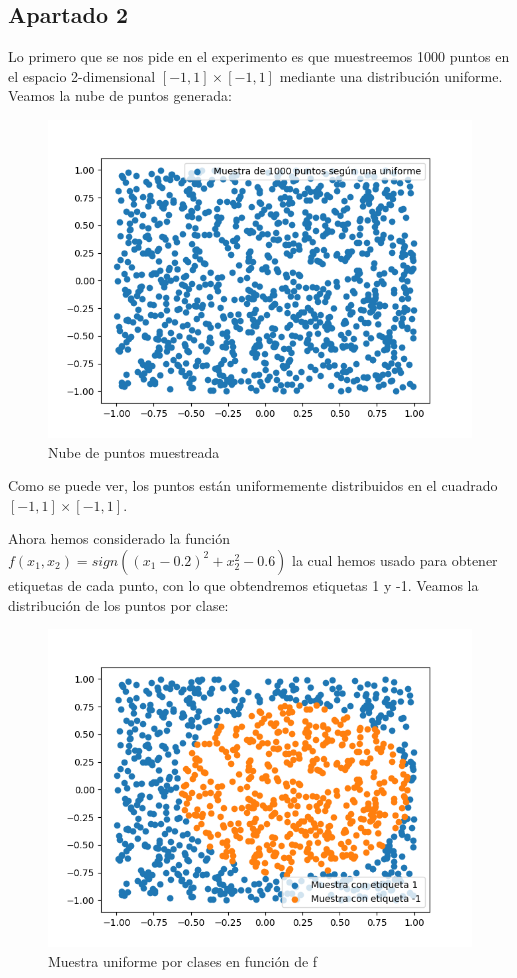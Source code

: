 \documentclass[12pt,a4paper]{article}
\begin{document}
\subsection{Apartado 2}
Lo primero que se nos pide en el experimento es que muestreemos 1000 puntos en el espacio 2-dimensional $[-1,1]\times [-1,1]$ mediante una distribución uniforme. Veamos la nube de puntos generada:

\begin{figure}[H]
	\centering
	\includegraphics[scale=0.7]{./Imagenes/ej2-2-1.png}
	\caption{Nube de puntos muestreada}
	\label{ej2-2-1}
\end{figure}

Como se puede ver, los puntos están uniformemente distribuidos en el cuadrado $[-1,1]\times [-1,1]$.

Ahora hemos considerado la función $f(x_1,x_2) = sign((x_1-0.2)^2 + x_{2}^{2}-0.6)$ la cual hemos usado para obtener etiquetas de cada punto, con lo que obtendremos etiquetas 1 y -1. Veamos la distribución de los puntos por clase:

\begin{figure}[H]
	\centering
	\includegraphics[scale=0.8]{./Imagenes/ej2-2-3.png}
	\caption{Muestra uniforme por clases en función de f}
	\label{ej2-2-3}
\end{figure}
\end{document}
